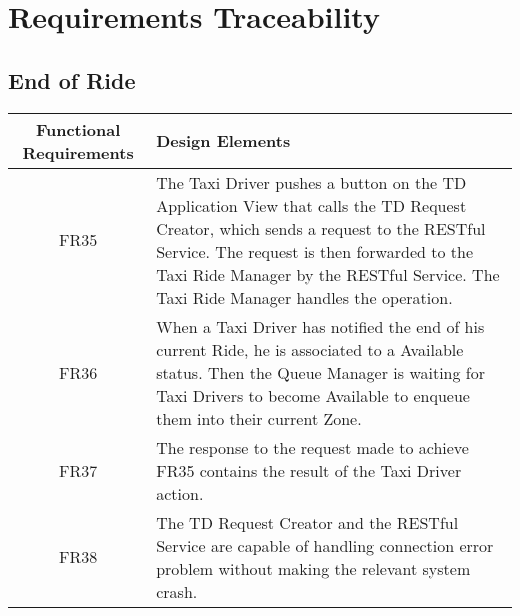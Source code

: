 \section{Requirements Traceability}
\subsection{End of Ride}
\begin{tabulary}{\linewidth\tymin=75pt}{C|L}
	Functional Requirements & Design Elements \\
	\hline
	FR35         & 
	The Taxi Driver pushes a button on the TD Application View that calls the TD Request Creator, which sends a request to the RESTful Service. The request is then forwarded to the Taxi Ride Manager by the RESTful Service. The Taxi Ride Manager handles the operation. \\
	\hline
	FR36         &
	When a Taxi Driver has notified the end of his current Ride, he is associated to a Available status. Then the Queue Manager is waiting for Taxi Drivers to become Available to enqueue them into their current Zone. \\
	\hline
	FR37         &
	The response to the request made to achieve FR35 contains the result of the Taxi Driver action. \\
	\hline
	FR38         &
	The TD Request Creator and the RESTful Service are capable of handling connection error problem without making the relevant system crash. \\
	\hline
\end{tabulary} 